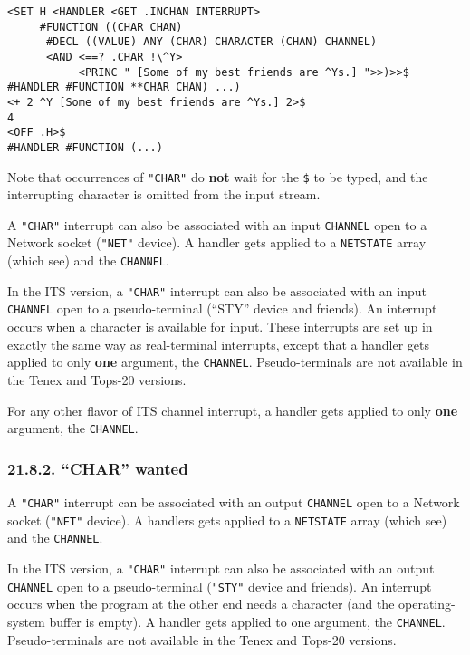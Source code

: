 \documentclass[a4paper,]{article}
\begin{document}
\begin{verbatim}
<SET H <HANDLER <GET .INCHAN INTERRUPT>
     #FUNCTION ((CHAR CHAN)
      #DECL ((VALUE) ANY (CHAR) CHARACTER (CHAN) CHANNEL)
      <AND <==? .CHAR !\^Y>
           <PRINC " [Some of my best friends are ^Ys.] ">>)>>$
#HANDLER #FUNCTION **CHAR CHAN) ...)
<+ 2 ^Y [Some of my best friends are ^Ys.] 2>$
4
<OFF .H>$
#HANDLER #FUNCTION (...)
\end{verbatim}

Note that occurrences of \texttt{"CHAR"} do \textbf{not} wait for the \texttt{\$} to be typed, and the interrupting
character is omitted from the input stream.

A \texttt{"CHAR"} interrupt can also be associated with an input \texttt{CHANNEL} open to a Network socket (\texttt{"NET"}
device). A handler gets applied to a \texttt{NETSTATE} array (which see) and the \texttt{CHANNEL}.

In the ITS version, a \texttt{"CHAR"} interrupt can also be associated with an input \texttt{CHANNEL} open to a
pseudo-terminal (``STY'' device and friends). An interrupt occurs when a character is available for input. These interrupts
are set up in exactly the same way as real-terminal interrupts, except that a handler gets applied to only \textbf{one}
argument, the \texttt{CHANNEL}. Pseudo-terminals are not available in the Tenex and Tops-20 versions.

For any other flavor of ITS channel interrupt, a handler gets applied to only \textbf{one} argument, the \texttt{CHANNEL}.

\subsubsection{\texorpdfstring{21.8.2. ``CHAR'' wanted}{21.8.2. CHAR wanted}}\label{char-wanted}

A \texttt{"CHAR"} interrupt can be associated with an output \texttt{CHANNEL} open to a Network socket (\texttt{"NET"}
device). A handlers gets applied to a \texttt{NETSTATE} array (which see) and the \texttt{CHANNEL}.

In the ITS version, a \texttt{"CHAR"} interrupt can also be associated with an output \texttt{CHANNEL} open to a
pseudo-terminal (\texttt{"STY"} device and friends). An interrupt occurs when the program at the other end needs a
character (and the operating-system buffer is empty). A handler gets applied to one argument, the \texttt{CHANNEL}.
Pseudo-terminals are not available in the Tenex and Tops-20 versions.
\end{document}
